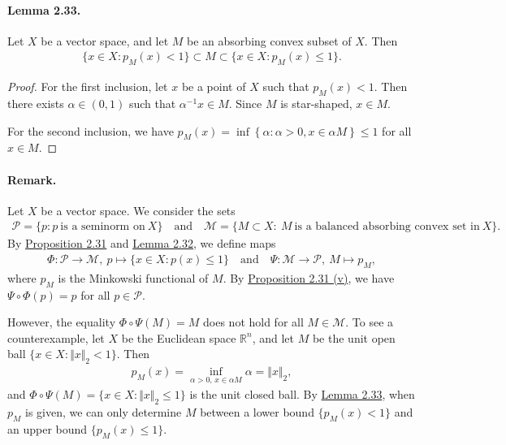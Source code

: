 \documentclass{article}
\begin{document}
\paragraph{Lemma 2.33.\label{lemma:2.33}} Let $X$ be a vector space, and let $M$ be an absorbing convex subset of $X$. Then
\begin{align*}
	\{x\in X:p_M(x)<1\}\subset M\subset \{x\in X:p_M(x)\leq 1\}.
\end{align*}
\begin{proof}
For the first inclusion, let $x$ be a point of $X$ such that $p_M(x)<1$. Then there exists $\alpha\in(0,1)$ such that $\alpha^{-1}x\in M$. Since $M$ is star-shaped, $x\in M$. 

For the second inclusion, we have $p_M(x)=\inf\left\{\alpha:\alpha>0,x\in\alpha M\right\}\leq 1$ for all $x\in M$.
\end{proof}

\paragraph{Remark.} Let $X$ be a vector space. We consider the sets
\begin{align*}
	\mathcal{P}=\{p:p\ \text{is a seminorm on}\ X\}\quad \text{and}\quad
	\mathscr{M}=\{M\subset X:\ M\ \text{is a balanced absorbing convex set in}\ X\}.
\end{align*}
By \hyperref[prop:2.31]{Proposition 2.31} and \hyperref[lemma:2.32]{Lemma 2.32}, we define maps 
\begin{align*}
	\Phi:\mathcal{P}\to\mathscr{M},\ p\mapsto\{x\in X:p(x)\leq 1\}\quad \text{and}\quad \Psi:\mathscr{M}\to\mathcal{P},\ M\mapsto p_M,
\end{align*}
where $p_M$ is the Minkowski functional of $M$. By \hyperref[prop:2.31]{Proposition 2.31 (v)}, we have $\Psi\circ\Phi(p)=p$ for all $p\in\mathcal{P}$.

However, the equality $\Phi\circ\Psi(M)=M$ does not hold for all $M\in\mathscr{M}$. To see a counterexample, let $X$ be the Euclidean space $\mathbb{R}^n$, and let $M$ be the unit open ball $\{x\in X:\Vert x\Vert_2 < 1\}$. Then
\begin{align*}
	p_M(x) = \inf_{\alpha>0,\,x\in\alpha M}\alpha = \Vert x\Vert_2,
\end{align*}
and $\Phi\circ\Psi(M) = \{x\in X:\Vert x\Vert_2\leq 1\}$ is the unit closed ball. By \hyperref[lemma:2.33]{Lemma 2.33}, when $p_M$ is given, we can only determine $M$ between a lower bound $\{p_M(x)<1\}$ and an upper bound $\{p_M(x)\leq 1\}$.
\end{document}
